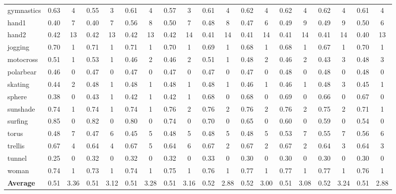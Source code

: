 \begin{table}
\begin{center}
\begin{tabular}{l c c c c c c c c c c c c c c c c c c}
gymnastics & 0.63 & 4 & 0.55 & 3 & 0.61 & 4 & 0.57 & 3 & 0.61 & 4 & 0.62 & 4 & 0.62 & 4 & 0.62 & 4 & 0.61 & 4\\
hand1 & 0.40 & 7 & 0.40 & 7 & 0.56 & 8 & 0.50 & 7 & 0.48 & 8 & 0.47 & 6 & 0.49 & 9 & 0.49 & 9 & 0.50 & 6\\
hand2 & 0.42 & 13 & 0.42 & 13 & 0.42 & 13 & 0.42 & 14 & 0.41 & 14 & 0.41 & 14 & 0.41 & 14 & 0.41 & 14 & 0.40 & 13\\
jogging & 0.70 & 1 & 0.71 & 1 & 0.71 & 1 & 0.70 & 1 & 0.69 & 1 & 0.68 & 1 & 0.68 & 1 & 0.67 & 1 & 0.70 & 1\\
motocross & 0.51 & 1 & 0.53 & 1 & 0.46 & 2 & 0.46 & 2 & 0.51 & 1 & 0.48 & 2 & 0.46 & 2 & 0.43 & 3 & 0.48 & 3\\
polarbear & 0.46 & 0 & 0.47 & 0 & 0.47 & 0 & 0.47 & 0 & 0.47 & 0 & 0.47 & 0 & 0.48 & 0 & 0.48 & 0 & 0.48 & 0\\
skating & 0.44 & 2 & 0.48 & 1 & 0.48 & 1 & 0.48 & 1 & 0.48 & 1 & 0.46 & 1 & 0.46 & 1 & 0.48 & 3 & 0.45 & 1\\
sphere & 0.38 & 0 & 0.43 & 1 & 0.42 & 1 & 0.42 & 1 & 0.68 & 0 & 0.68 & 0 & 0.69 & 0 & 0.66 & 0 & 0.67 & 0\\
sunshade & 0.74 & 1 & 0.74 & 1 & 0.74 & 1 & 0.76 & 2 & 0.76 & 2 & 0.76 & 2 & 0.76 & 2 & 0.75 & 2 & 0.71 & 1\\
surfing & 0.85 & 0 & 0.82 & 0 & 0.80 & 0 & 0.74 & 0 & 0.70 & 0 & 0.65 & 0 & 0.60 & 0 & 0.59 & 0 & 0.54 & 0\\
torus & 0.48 & 7 & 0.47 & 6 & 0.45 & 5 & 0.48 & 5 & 0.48 & 5 & 0.48 & 5 & 0.53 & 7 & 0.55 & 7 & 0.56 & 6\\
trellis & 0.67 & 4 & 0.64 & 4 & 0.67 & 5 & 0.64 & 6 & 0.67 & 2 & 0.67 & 2 & 0.67 & 2 & 0.64 & 3 & 0.64 & 3\\
tunnel & 0.25 & 0 & 0.32 & 0 & 0.32 & 0 & 0.32 & 0 & 0.33 & 0 & 0.30 & 0 & 0.30 & 0 & 0.30 & 0 & 0.30 & 0\\
woman & 0.74 & 1 & 0.73 & 1 & 0.74 & 1 & 0.75 & 1 & 0.76 & 1 & 0.77 & 1 & 0.77 & 1 & 0.77 & 1 & 0.76 & 1\\
\hline 
{\bf Average} & 0.51 & 3.36 & 0.51 & 3.12 & 0.51 & 3.28 & 0.51 & 3.16 & 0.52 & 2.88 & 0.52 & 3.00 & 0.51 & 3.08 & 0.52 & 3.24 & 0.51 & 2.88\\
\hline 
\end{tabular}
\end{center}
\end{table}
